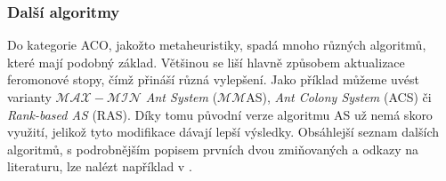 \documentclass[a4paper,12pt]{article}
\begin{document}





\subsubsection{Další algoritmy}
Do kategorie ACO, jakožto metaheuristiky, spadá mnoho různých algoritmů, které mají podobný základ. Většinou se
liší hlavně způsobem aktualizace feromonové stopy, čímž přináší různá vylepšení. Jako příklad můžeme uvést
varianty {\it $\mathcal{MAX-MIN}$ Ant System} ($\mathcal{MM}$AS), {\it Ant Colony System} (ACS) či
{\it Rank-based AS} (RAS). Díky tomu původní verze algoritmu AS už nemá skoro využití, jelikož tyto modifikace
dávají lepší výsledky. Obsáhlejší seznam dalších algoritmů, s podrobnějším popisem prvních dvou zmiňovaných
a odkazy na literaturu, lze nalézt například v \cite{Dorigo06antcolony}.



\end{document}
